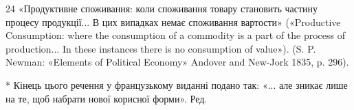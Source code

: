 24 «Продуктивне споживання: коли споживання товару становить
частину процесу продукції... В цих випадках немає споживання вартости»
(«Productive Consumption: where the consumption of a commodity is a
part of the process of production... In these instances there is no consumption
of value»). (S. P. Newman: «Elements of Political Economy» Andover
and New-Jork 1835, p. 296).

* Кінець цього речення у французькому виданні подано так: «... але
зникає лише на те, щоб набрати нової корисної форми». Ред.

